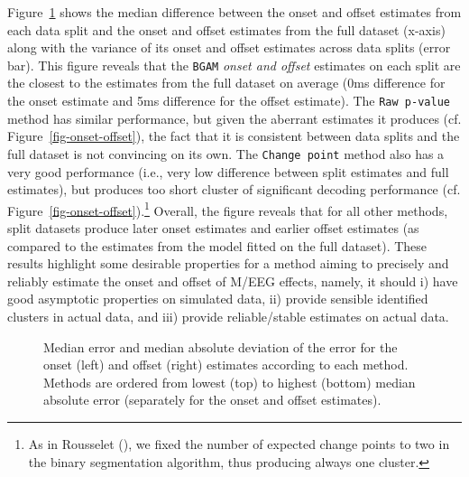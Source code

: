 \documentclass[
  man,
  floatsintext,
  longtable,
  a4paper,
  nolmodern,
  notxfonts,
  notimes,
  colorlinks=true,linkcolor=blue,citecolor=blue,urlcolor=blue]{apa7}
\begin{document}
Figure~\ref{fig-reliability} shows the median difference between the
onset and offset estimates from each data split and the onset and offset
estimates from the full dataset (x-axis) along with the variance of its
onset and offset estimates across data splits (error bar). This figure
reveals that the \texttt{BGAM} \emph{onset and offset} estimates on each
split are the closest to the estimates from the full dataset on average
(0ms difference for the onset estimate and 5ms difference for the offset
estimate). The \texttt{Raw\ p-value} method has similar performance, but
given the aberrant estimates it produces (cf.
Figure~\ref{fig-onset-offset}), the fact that it is consistent between
data splits and the full dataset is not convincing on its own. The
\texttt{Change\ point} method also has a very good performance (i.e.,
very low difference between split estimates and full estimates), but
produces too short cluster of significant decoding performance (cf.
Figure~\ref{fig-onset-offset}).\footnote{As in Rousselet
  (), we fixed the number of
  expected change points to two in the binary segmentation algorithm,
  thus producing always one cluster.} Overall, the figure reveals that
for all other methods, split datasets produce later onset estimates and
earlier offset estimates (as compared to the estimates from the model
fitted on the full dataset). These results highlight some desirable
properties for a method aiming to precisely and reliably estimate the
onset and offset of M/EEG effects, namely, it should i) have good
asymptotic properties on simulated data, ii) provide sensible identified
clusters in actual data, and iii) provide reliable/stable estimates on
actual data.

\begin{figure}[!htb]

\caption{\label{fig-reliability}Median error and median absolute
deviation of the error for the onset (left) and offset (right) estimates
according to each method. Methods are ordered from lowest (top) to
highest (bottom) median absolute error (separately for the onset and
offset estimates).}


\end{figure}%
\end{document}
